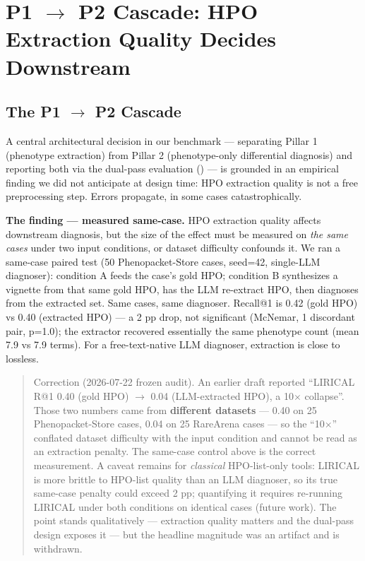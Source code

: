 \section{P1 \ensuremath{\rightarrow} P2 Cascade: HPO Extraction Quality Decides Downstream}\label{sec-7-1}

\subsection{The P1 \ensuremath{\rightarrow} P2 Cascade}\label{the-p1-p2-cascade}

A central architectural decision in our benchmark --- separating Pillar 1 (phenotype extraction) from Pillar 2 (phenotype-only differential diagnosis) and reporting both via the dual-pass evaluation () --- is grounded in an empirical finding we did not anticipate at design time: HPO extraction quality is not a free preprocessing step. Errors propagate, in some cases catastrophically.

\textbf{The finding --- measured same-case.} HPO extraction quality affects downstream diagnosis, but the size of the effect must be measured on \emph{the same cases} under two input conditions, or dataset difficulty confounds it. We ran a same-case paired test (50 Phenopacket-Store cases, seed=42, single-LLM diagnoser): condition A feeds the case's gold HPO; condition B synthesizes a vignette from that same gold HPO, has the LLM re-extract HPO, then diagnoses from the extracted set. Same cases, same diagnoser. Recall@1 is 0.42 (gold HPO) vs 0.40 (extracted HPO) --- a 2 pp drop, not significant (McNemar, 1 discordant pair, p=1.0); the extractor recovered essentially the same phenotype count (mean 7.9 vs 7.9 terms). For a free-text-native LLM diagnoser, extraction is close to lossless.

\begin{quote}
Correction (2026-07-22 frozen audit). An earlier draft reported ``LIRICAL R@1 0.40 (gold HPO) \ensuremath{\rightarrow} 0.04 (LLM-extracted HPO), a 10\ensuremath{\times} collapse''. Those two numbers came from \textbf{different datasets} --- 0.40 on 25 Phenopacket-Store cases, 0.04 on 25 RareArena cases --- so the ``10\ensuremath{\times}'' conflated dataset difficulty with the input condition and cannot be read as an extraction penalty. The same-case control above is the correct measurement. A caveat remains for \emph{classical} HPO-list-only tools: LIRICAL is more brittle to HPO-list quality than an LLM diagnoser, so its true same-case penalty could exceed 2 pp; quantifying it requires re-running LIRICAL under both conditions on identical cases (future work). The point stands qualitatively --- extraction quality matters and the dual-pass design exposes it --- but the headline magnitude was an artifact and is withdrawn.
\end{quote}

